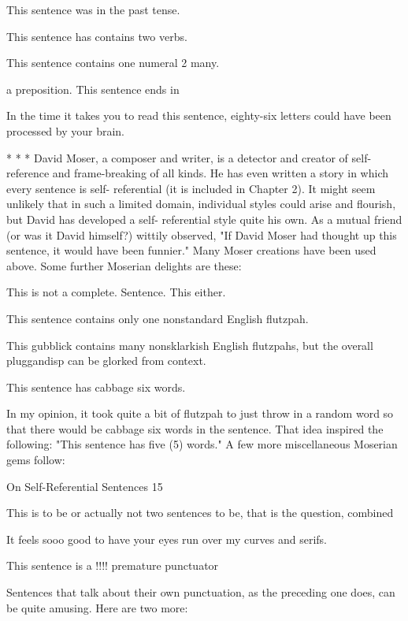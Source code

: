        This sentence was in the past tense.

       This sentence has contains two verbs.

       This sentence contains one numeral 2 many.

       a preposition. This sentence ends in

       In the time it takes you to read this sentence, eighty-six letters could have been
processed by your brain.

                                      *       *       *
David Moser, a composer and writer, is a detector and creator of self-reference and
frame-breaking of all kinds. He has even written a story in which every sentence is self-
referential (it is included in Chapter 2). It might seem unlikely that in such a limited
domain, individual styles could arise and flourish, but David has developed a self-
referential style quite his own. As a mutual friend (or was it David himself?) wittily
observed, "If David Moser had thought up this sentence, it would have been funnier."
Many Moser creations have been used above. Some further Moserian delights are these:

   This is not a complete. Sentence. This either.

   This sentence contains only one nonstandard English flutzpah.

   This gubblick contains many nonsklarkish English flutzpahs, but the overall
     pluggandisp can be glorked from context.

   This sentence has cabbage six words.

In my opinion, it took quite a bit of flutzpah to just throw in a random word so that there
would be cabbage six words in the sentence. That idea inspired the following: "This
sentence has five (5) words." A few more miscellaneous Moserian gems follow:




On Self-Referential Sentences                                                               15

       This is to be or actually not two sentences to be, that is the question, combined

       It feels sooo good to have your eyes run over my curves and serifs.

       This sentence is a !!!! premature punctuator

       Sentences that talk about their own punctuation, as the preceding one does, can be
quite amusing. Here are two more:

